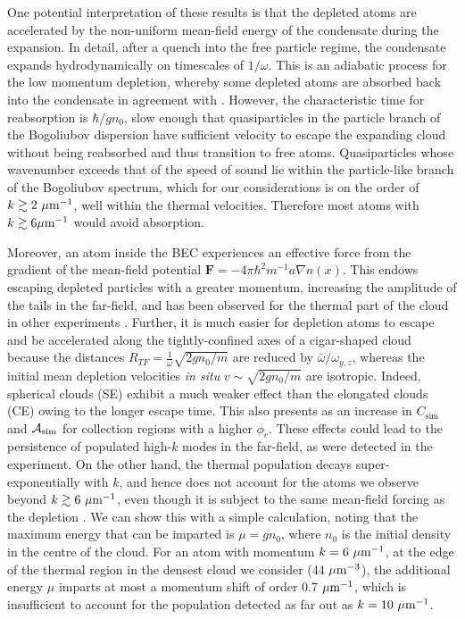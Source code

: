 {    One potential interpretation of these results is that the depleted atoms are accelerated by the non-uniform mean-field energy of the condensate during the expansion.
	In detail, after a quench into the free particle regime, the condensate expands hydrodynamically on timescales of $1/\omega$. 
	This is an adiabatic process for the low momentum depletion, whereby some depleted atoms are absorbed back into the condensate in agreement with \cite{Qu16}.
	However, the characteristic time for reabsorption is $\hbar/gn_0$, slow enough that quasiparticles in the particle branch of the Bogoliubov dispersion have sufficient velocity to escape the expanding cloud without being reabsorbed and thus transition to free atoms. 
	Quasiparticles whose wavenumber exceeds that of the speed of sound lie within the particle-like branch of the Bogoliubov spectrum, which for our considerations is on the order of $k\gtrsim2~\mu\textrm{m}^{-1}$, well within the thermal velocities. Therefore most atoms with $k\gtrsim 6 \mu\textrm{m}^{-1}$ would avoid absorption.
	
	Moreover, an atom inside the BEC experiences an effective force from the gradient of the mean-field potential $\textbf{F} = -4\pi\hbar^2 m^{-1}a \nabla  n(x)$. 
	This endows escaping depleted particles with a greater momentum, increasing the amplitude of the tails in the far-field, and has been observed for the thermal part of the cloud in other experiments \cite{Ozeri02}.
	Further, it is much easier for depletion atoms to escape and be accelerated along the tightly-confined axes of a cigar-shaped cloud because the distances $R_{TF}=\frac{1}{\omega}\sqrt{2gn_0/m}$ are reduced by $\bar{\omega}/\omega_{y,z}$, whereas the initial mean depletion velocities \textit{in situ} $v\sim \sqrt{2gn_0/m}$ are isotropic.
	Indeed, spherical clouds (SE) exhibit a much weaker effect than the elongated clouds (CE) owing to the longer escape time.
	This also presents as an increase in $C_\textrm{sim}$ {and $\mathcal{A}_{\rm sim}$ for} collection regions {with a higher $\phi_c$}. 
    These effects could lead to the persistence of populated high-$k$ modes in the far-field, as were detected in the experiment.
	On the other hand, the thermal population decays super-exponentially with $k$, and hence does not account for the atoms we observe beyond $k\gtrsim 6~\mu\textrm{m}^{-1}$, even though it is subject to the same mean-field forcing as the depletion \cite{Ozeri02}.
	We can show this with a simple calculation, noting that the maximum energy that can be imparted is $\mu=g n_0$, where $n_0$ is the initial density in the centre of the cloud.
	For an atom with momentum $k=6~\mu\textrm{m}^{-1}$, at the edge of the thermal region in the densest cloud we consider (44 $\mu\textrm{m}^{-3}$), the additional energy $\mu$ imparts at most a momentum shift of order 0.7 $\mu\textrm{m}^{-1}$, which is insufficient to account for the population detected as far out as $k=10~\mu\textrm{m}^{-1}$.
	
}
